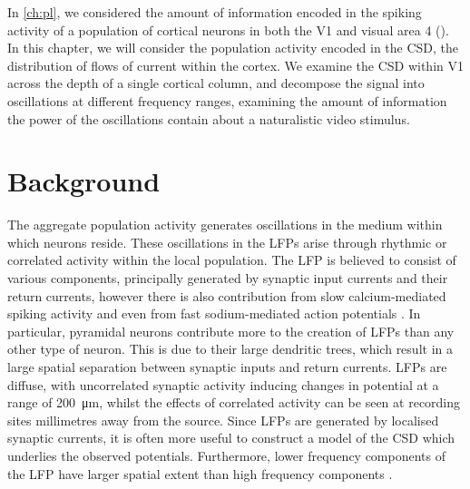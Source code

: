 
In \autoref{ch:pl}, we considered the amount of information encoded in the spiking activity of a population of cortical neurons in both the \acf{V1} and visual area 4 ().
In this chapter, we will consider the population activity encoded in the \ac{CSD}, the distribution of flows of current within the cortex.
We examine the \ac{CSD} within \ac{V1} across the depth of a single cortical column, and decompose the signal into oscillations at different frequency ranges, examining the amount of information the power of the oscillations contain about a naturalistic video stimulus.


\section{Background}




The aggregate population activity generates oscillations in the medium within which neurons reside.
These oscillations in the \acp{LFP} arise through rhythmic or correlated activity within the local population.
The \ac{LFP} is believed to consist of various components, principally generated by synaptic input currents and their return currents, however there is also contribution from slow calcium-mediated spiking activity and even from fast sodium-mediated action potentials \citep{Einevoll2013}.
In particular, pyramidal neurons contribute more to the creation of \acp{LFP} than any other type of neuron.
This is due to their large dendritic trees, which result in a large spatial separation between synaptic inputs and return currents.
\acp{LFP} are diffuse, with uncorrelated synaptic activity inducing changes in potential at a range of \SI{200}{\micro\metre}, whilst the effects of correlated activity can be seen at recording sites millimetres away from the source.
Since \acp{LFP} are generated by localised synaptic currents, it is often more useful to construct a model of the \acf{CSD} which underlies the observed potentials.
Furthermore, lower frequency components of the \ac{LFP} have larger spatial extent than high frequency components \citep{Leski2013}.

